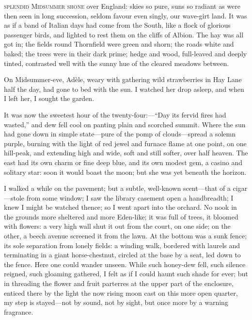 
 \textsc{splendid Midsummer shone} over England: skies so pure, suns so radiant
as were then seen in long succession, seldom favour even singly, our
wave-girt land. It was as if a band of Italian days had come from the
South, like a flock of glorious passenger birds, and lighted to rest
them on the cliffs of Albion. The hay was all got in; the fields round
Thornfield were green and shorn; the roads white and baked; the trees
were in their dark prime; hedge and wood, full-leaved and deeply tinted,
contrasted well with the sunny hue of the cleared meadows between.

On Midsummer-eve, Adèle, weary with gathering wild strawberries in Hay
Lane half the day, had gone to bed with the sun. I watched her drop
asleep, and when I left her, I sought the garden.

It was now the sweetest hour of the twenty-four:---\enquote{Day its
fervid fires had wasted,} and dew fell cool on panting plain and
scorched summit. Where the sun had gone down in simple state---pure of
the pomp of clouds---spread a solemn purple, burning with the light of
red jewel and furnace flame at one point, on one hill-peak, and
extending high and wide, soft and still softer, over half heaven. The
east had its own charm or fine deep blue, and its own modest gem, a
casino and solitary star: soon it would boast the moon; but she was yet
beneath the horizon.

I walked a while on the pavement; but a subtle, well-known scent---that
of a cigar---stole from some window; I saw the library casement open a
handbreadth; I knew I might be watched thence; so I went apart into the
orchard. No nook in the grounds more sheltered and more Eden-like; it
was full of trees, it bloomed with flowers: a very high wall shut it out
from the court, on one side; on the other, a beech avenue screened it
from the lawn. At the bottom was a sunk fence; its sole separation from
lonely fields: a winding walk, bordered with laurels and terminating in
a giant horse-chestnut, circled at the base by a seat, led down to the
fence. Here one could wander unseen. While such honey-dew fell, such
silence reigned, such gloaming gathered, I felt as if I could haunt such
shade for ever; but in threading the flower and fruit parterres at the
upper part of the enclosure, enticed there by the light the now rising
moon cast on this more open quarter, my step is stayed---not by sound,
not by sight, but once more by a warning fragrance.

